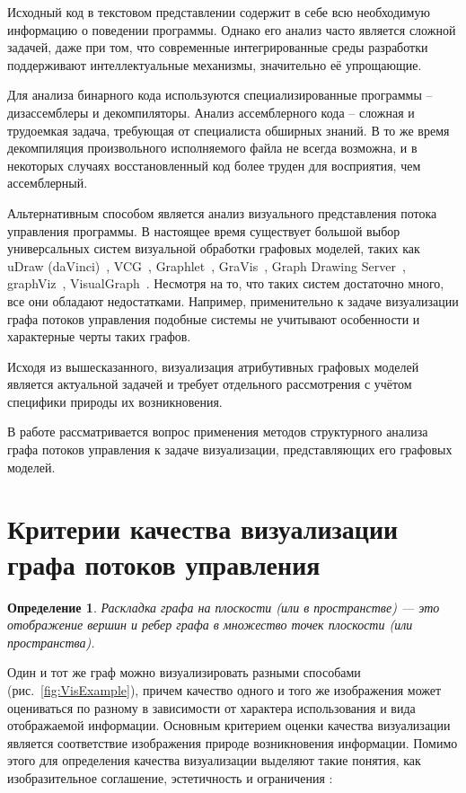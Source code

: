 \documentclass{jctart15a}
\begin{document}
Исходный код в текстовом представлении содержит в себе всю необходимую информацию о поведении программы. Однако его анализ часто является сложной задачей, даже при том, что современные интегрированные среды разработки поддерживают интеллектуальные механизмы, значительно её упрощающие.

Для анализа бинарного кода используются специализированные программы -- дизассемблеры и декомпиляторы. Анализ ассемблерного кода -- сложная и трудоемкая задача, требующая от специалиста обширных знаний. В то же время декомпиляция произвольного исполняемого файла не всегда возможна, и в некоторых случаях восстановленный код более труден для восприятия, чем ассемблерный.

Альтернативным способом является анализ визуального представления потока управления программы. В настоящее время существует большой выбор универсальных систем визуальной обработки графовых моделей, таких как uDraw (daVinci)~\cite{10}, VCG~\cite{14}, Graphlet~\cite{12}, GraVis~\cite{13}, Graph Drawing Server~\cite{9}, graphViz~\cite{11}, VisualGraph~\cite{15}. Несмотря на то, что таких систем достаточно много, все они обладают недостатками. Например, применительно к задаче визуализации графа потоков управления подобные системы не учитывают особенности и характерные черты таких графов.

Исходя из вышесказанного, визуализация атрибутивных графовых моделей является актуальной задачей и требует отдельного рассмотрения с учётом специфики природы их возникновения.

В работе рассматривается вопрос применения методов структурного анализа~\cite{18} графа потоков управления к задаче визуализации, представляющих его графовых моделей.


\section{Критерии качества визуализации графа потоков управления}
\newtheorem{vis}{Определение}
\begin{vis}
Раскладка графа на плоскости (или в пространстве) — это отображение вершин и ребер графа в множество точек плоскости (или пространства).
\end{vis}
Один и тот же граф можно визуализировать разными способами (рис.~\ref{fig:VisExample}), причем качество одного и того же изображения может оцениваться по разному в зависимости от характера использования и вида отображаемой информации. Основным критерием оценки качества визуализации является соответствие изображения природе возникновения информации. Помимо этого для определения качества визуализации выделяют такие понятия, как изобразительное соглашение, эстетичность и ограничения \cite{1}:
\end{document}
